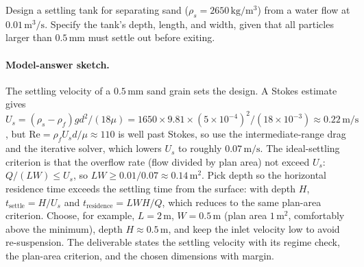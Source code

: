 \begin{exercise}
Design a settling tank for separating sand ($\rho_s = 2650\,\si{
\kilogram\per\meter\cubed}$) from a water flow at $0.01\,\text{m}
^3\text{/s}$. Specify the tank's depth, length, and width, given
that all particles larger than $0.5\,\si{\milli\meter}$ must
settle out before exiting.

\paragraph{Model-answer sketch.} The settling velocity of a
$0.5\,\si{\milli\meter}$ sand grain sets the design. A Stokes
estimate gives $U_s = (\rho_s-\rho_f)g d^2/(18\mu) = 1650\times9.81
\times(5\times10^{-4})^2/(18\times10^{-3})\approx0.22\,\si{\meter\per
\second}$, but $\text{Re}=\rho_f U_s d/\mu\approx110$ is well past
Stokes, so use the intermediate-range drag and the iterative solver,
which lowers $U_s$ to roughly $0.07\,\si{\meter\per\second}$. The
ideal-settling criterion is that the overflow rate (flow divided by
plan area) not exceed $U_s$: $Q/(LW)\le U_s$, so $LW\ge0.01/0.07
\approx0.14\,\si{\meter}^2$. Pick depth so the horizontal residence
time exceeds the settling time from the surface: with depth $H$,
$t_{\text{settle}}=H/U_s$ and $t_{\text{residence}}=L W H/Q$, which
reduces to the same plan-area criterion. Choose, for example,
$L=2\,\si{\meter}$, $W=0.5\,\si{\meter}$ (plan area $1\,\si{\meter}
^2$, comfortably above the minimum), depth $H\approx0.5\,\si{\meter}$,
and keep the inlet velocity low to avoid re-suspension. The
deliverable states the settling velocity with its regime check, the
plan-area criterion, and the chosen dimensions with margin.
\end{exercise}

